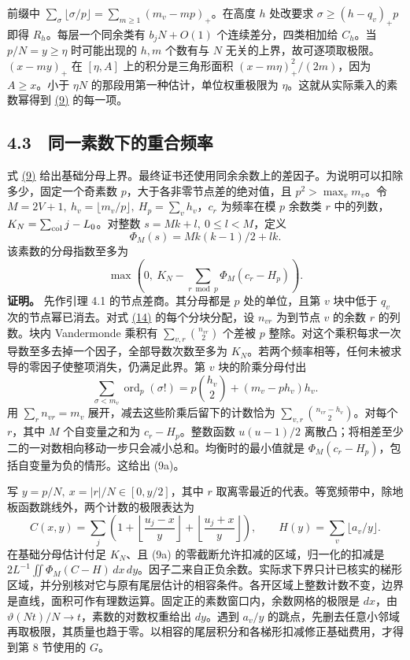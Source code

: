 \documentclass[11pt,a4paper]{article}
\begin{document}
前缀中 \(\sum_\sigma\lfloor\sigma/p\rfloor=\sum_{m\ge1}(m_v-mp)_+\)。在高度 \(h\) 处改要求 \(\sigma\ge(h-q_v)_+p\) 即得 \(R_h\)。每层一个同余类有 \(b_jN+O(1)\) 个连续差分，四类相加给 \(C_h\)。当 \(p/N=y\ge\eta\) 时可能出现的 \(h,m\) 个数有与 \(N\) 无关的上界，故可逐项取极限。\((x-my)_+\) 在 \([\eta,A]\) 上的积分是三角形面积 \((x-m\eta)_+^2/(2m)\)，因为 \(A\ge x\)。小于 \(\eta N\) 的那段用第一种估计，单位权重极限为 \(\eta\)。这就从实际乘入的素数幂得到 \hyperref[eq:9]{(9)} 的每一项。



\subsection{4.3　同一素数下的重合频率}
式 \hyperref[eq:9]{(9)} 给出基础分母上界。最终证书还使用同余余数上的差因子。为说明可以扣除多少，固定一个奇素数 \(p\)，大于各非零节点差的绝对值，且 \(p^2>\max_v m_v\)。令 \(M=2V+1,\ h_v=\lfloor m_v/p\rfloor,\ H_p=\sum_v h_v\)，\(c_r\) 为频率在模 \(p\) 余数类 \(r\) 中的列数，\(K_N=\sum_{\rm col} j-L_0\)。对整数 \(s=Mk+l,\ 0\le l<M\)，定义
\[
 \Phi_M(s)=M k(k-1)/2+lk .
\]
该素数的分母指数至多为
\[
 \max\left(0,\ K_N-\sum_{r\bmod p}\Phi_M(c_r-H_p)\right).                 \tag{9a}
\]
\textbf{证明。} 先作引理 4.1 的节点差商。其分母都是 \(p\) 处的单位，且第 \(v\) 块中低于 \(q_v\) 次的节点幂已消去。对式 \hyperref[eq:14]{(14)} 的每个分块分配，设 \(n_{vr}\) 为到节点 \(v\) 的余数 \(r\) 的列数。块内 Vandermonde 乘积有 \(\sum_{v,r}\binom{n_{vr}}2\) 个差被 \(p\) 整除。对这个乘积每求一次导数至多去掉一个因子，全部导数次数至多为 \(K_N\)。若两个频率相等，任何未被求导的零因子使整项消失，仍满足此界。第 \(v\) 块的阶乘分母付出
\[
 \sum_{\sigma<m_v}\operatorname{ord}_p(\sigma!)
 =p\binom{h_v}2+(m_v-ph_v)h_v .
\]
用 \(\sum_r n_{vr}=m_v\) 展开，减去这些阶乘后留下的计数恰为
\(\sum_{v,r}\binom{n_{vr}-h_v}{2}\)。对每个 \(r\)，其中 \(M\) 个自变量之和为 \(c_r-H_p\)。整数函数 \(u(u-1)/2\) 离散凸；将相差至少二的一对数相向移动一步只会减小总和。均衡时的最小值就是 \(\Phi_M(c_r-H_p)\)，包括自变量为负的情形。这给出 (9a)。

写 \(y=p/N,\ x=|r|/N\in[0,y/2]\)，其中 \(r\) 取离零最近的代表。等宽频带中，除地板函数跳线外，两个计数的极限表达为
\[
 C(x,y)=\sum_j\left(1+\left\lfloor\frac{u_j-x}{y}\right\rfloor+
                           \left\lfloor\frac{u_j+x}{y}\right\rfloor\right),
 \qquad H(y)=\sum_v\lfloor a_v/y\rfloor .
\]
在基础分母估计付足 \(K_N\)、且 (9a) 的零截断允许扣减的区域，归一化的扣减是 \(2L^{-1}\iint\Phi_M(C-H)\,dx\,dy\)。因子二来自正负余数。实际求下界只计已核实的梯形区域，并分别核对它与原有尾层估计的相容条件。各开区域上整数计数不变，边界是直线，面积可作有理数运算。固定正的素数窗口内，余数网格的极限是 \(dx\)，由 \(\vartheta(Nt)/N\to t\)，素数的对数权重给出 \(dy\)。遇到 \(a_v/y\) 的跳点，先删去任意小邻域再取极限，其质量也趋于零。以相容的尾层积分和各梯形扣减修正基础费用，才得到第 8 节使用的 \(G\)。
\end{document}

